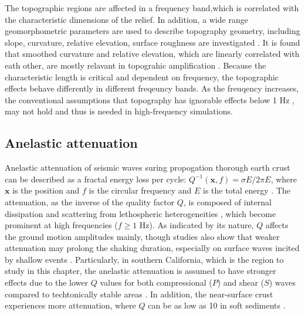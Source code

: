 The topographic regions are affected in a frequency band,which is correlated with the characteristic dimensions of the relief. In addition, a wide range geomorphometric parameters are used to describe topography geometry, including slope, curvature, relative elevation, surface roughness are investigated \citep{ashfordAnalysisTopographicAmplification1997,nguyenEvaluationSeismicGround2007,bouckovalasNumericalEvaluationSlope2005}. It is found that smoothed curvature and relative elevation, which are linearly correlated with eath other, are mostly relavant in topograhic amplification \citep{maufroyFrequencyScaledCurvature2015,raiEmpiricalTerrainBasedTopographic2017}. Because the characteristic length is critical and dependent on frequency, the topographic effects behave differently in different freqeuncy bands. As the freuqency increases, the conventional assumptions that topography has ignorable effects below 1 Hz \citep{booreNoteEffectSimple1972, pischiuttaTopographicEffectsHill2010}, may not hold and thus is needed in high-frequency simulations.


\subsection{Anelastic attenuation}

Anelastic attenuation of seismic waves suring propogation thorough earth crust can be described as a fractal energy loss per cycle: $Q^{-1}(\textbf{x}, f) = \sigma E / 2\pi E$, where $\textbf{x}$ is the position and $f$ is the circular frequency and $E$ is the total energy \citep{oconnellMeasuresDissipationViscoelastic1978}. The attenuation, as the inverse of the quality factor $Q$, is composed of internal dissipation and scattering from lethospheric heterogeneities \citep{satoSeismicWavePropagation2009}, which become prominent at high frequencies ($f \geqslant  1$ Hz). As indicated by its nature, $Q$ affects the ground motion amplitudes mainly, though studies also show that weaker attenuation may prolong the shaking duration, especially on surface waves incited by shallow events \citep{imperatoriRoleTopographyLateral2015, laiShallowBasinStructure2020}. Particularly, in southern California, which is the region to study in this chapter, the anelastic attenuation is assumed to have stronger effects due to the lower $Q$ values for both compressional ($P$) and shear ($S$) waves compared to techtonically stable areas \citep{ericksonFrequencyDependentLgContinental2004,frankelAttenuationHighfrequencyShear1990}. In addition, the near-surface crust experiences more attenuation, where $Q$ can be as low as 10 in soft sediments \citep{abercrombieNearsurfaceAttenuationSite1997,asterHighfrequencyBoreholeSeismograms1991}.

